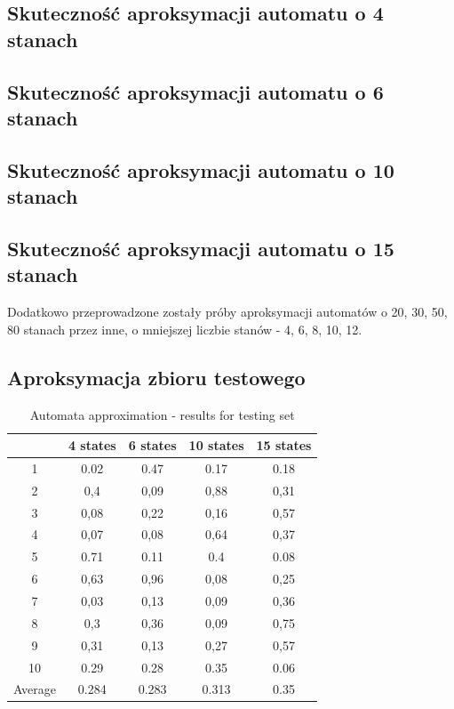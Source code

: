 \documentclass[runningheads,a4paper]{llncs}
\begin{document}
\subsection{Skuteczność aproksymacji automatu o 4 stanach}

\subsection{Skuteczność aproksymacji automatu o 6 stanach}

\subsection{Skuteczność aproksymacji automatu o 10 stanach}

\subsection{Skuteczność aproksymacji automatu o 15 stanach}


Dodatkowo przeprowadzone zostały próby aproksymacji automatów o 20, 30, 50, 80 stanach przez inne, o mniejszej liczbie stanów - 4, 6, 8, 10, 12.

\subsection{Aproksymacja zbioru testowego}

\begin{table}[]
\centering
\caption{Automata approximation - results for testing set}
\label{my-label}
\begin{tabular}{@{}ccccc@{}}
\toprule
        & 4 states & 6 states & 10 states & 15 states \\ \midrule
1       & 0.02     & 0.47     & 0.17      & 0.18      \\
2       & 0,4      & 0,09     & 0,88      & 0,31      \\
3       & 0,08     & 0,22     & 0,16      & 0,57      \\
4       & 0,07     & 0,08     & 0,64      & 0,37      \\
5       & 0.71     & 0.11     & 0.4       & 0.08      \\
6       & 0,63     & 0,96     & 0,08      & 0,25        \\
7       & 0,03     & 0,13     & 0,09      & 0,36        \\
8       & 0,3      & 0,36     & 0,09      & 0,75         \\
9       & 0,31     & 0,13     & 0,27      & 0,57     \\
10      & 0.29     & 0.28     & 0.35      & 0.06      \\
Average & 0.284    & 0.283    & 0.313     & 0.35      \\ \bottomrule
\end{tabular}
\end{table}
\end{document}
